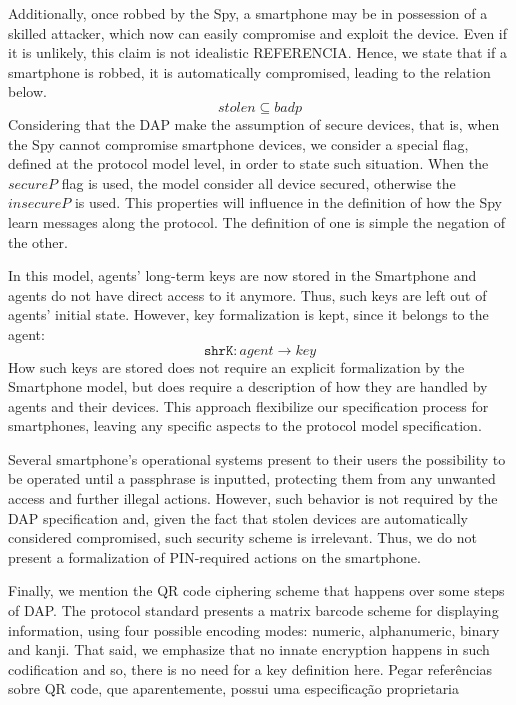 Additionally, once robbed by the Spy, a smartphone may be in possession of a skilled attacker, which now can easily compromise and exploit the device. Even if it is unlikely, this claim is not idealistic {\color{blue} REFERENCIA}. Hence, we state that if a smartphone is robbed, it is automatically compromised, leading to the relation below.
%
$$stolen \subseteq badp$$
%
Considering that the DAP make the assumption of secure devices, that is, when the Spy cannot compromise smartphone devices, we consider a special flag, defined at the protocol model level, in order to state such situation. When the \(secureP\) flag is used, the model consider all device secured, otherwise the \(insecureP\) is used. This properties will influence in the definition of how the Spy learn messages along the protocol. The definition of one is simple the negation of the other.



In this model, agents' long-term keys are now stored in the Smartphone and agents do not have direct access to it anymore. Thus, such keys are left out of agents' initial state. However, key formalization is kept, since it belongs to the agent:
%
$$\texttt{shrK} : agent \longrightarrow key$$
%
How such keys are stored does not require an explicit formalization by the Smartphone model, but does require a description of how they are handled by agents and their devices. This approach flexibilize our specification process for smartphones, leaving any specific aspects to the protocol model specification.

Several smartphone's operational systems present to their users the possibility to be operated until a passphrase is inputted, protecting them from any unwanted access and further illegal actions. However, such behavior is not required by the DAP specification and, given the fact that stolen devices are automatically considered compromised, such security scheme is irrelevant. Thus, we do not present a formalization of PIN-required actions on the smartphone.

Finally, we mention the QR code ciphering scheme that happens over some steps of DAP. The protocol standard presents a matrix barcode scheme for displaying information, using four possible encoding modes: numeric, alphanumeric, binary and kanji. That said, we emphasize that no innate encryption happens in such codification and so, there is no need for a key definition here. {\color{blue} Pegar referências sobre QR code, que aparentemente, possui uma especificação proprietaria}



